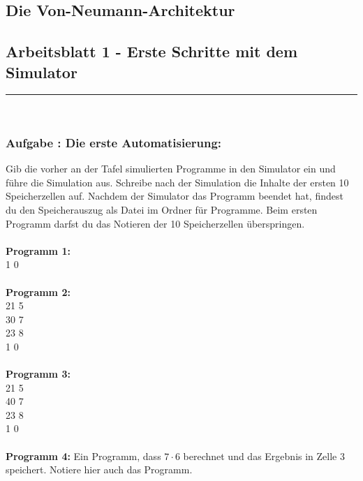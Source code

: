 \documentclass[a4paper,12pt]{article}
\newcounter{aufgnr}
\begin{document}
\begin{center}
\section*{Die Von-Neumann-Architektur}
\subsection*{Arbeitsblatt 1 - Erste Schritte mit dem Simulator}
\end{center}

\hrule
\vspace{.5cm}

~\\
\subsubsection*{Aufgabe \theaufgnr: Die erste Automatisierung:}
Gib die vorher an der Tafel simulierten Programme in den Simulator ein und führe die Simulation aus. Schreibe nach der Simulation die Inhalte der ersten 10 Speicherzellen auf. Nachdem der Simulator das Programm beendet hat, findest du den Speicherauszug als Datei im Ordner für Programme. Beim ersten Programm darfst du das Notieren der 10 Speicherzellen überspringen.\\
\\
\textbf{Programm 1:}\\
1 0\\
\\
\textbf{Programm 2:}\\
21 5\\
30 7\\
23 8\\
1 0\\
\\
\textbf{Programm 3:}\\
21 5\\
40 7\\
23 8\\
1 0\\
\\
\textbf{Programm 4:} Ein Programm, dass $7 \cdot 6$ berechnet und das Ergebnis in Zelle 3 speichert. Notiere hier auch das Programm.\\
\\
\\
\\
\\
\\


\end{document}
